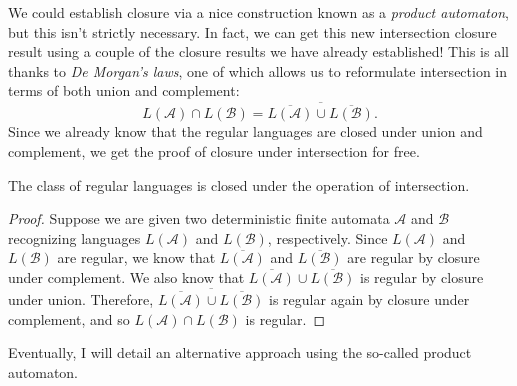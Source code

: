 We could establish closure via a nice construction known as a \emph{product automaton}, but this isn't strictly necessary. In fact, we can get this new intersection closure result using a couple of the closure results we have already established! This is all thanks to \emph{De Morgan's laws}, one of which allows us to reformulate intersection in terms of both union and complement:
\begin{equation*}
L(\mathcal{A}) \cap L(\mathcal{B}) = \overline{\overline{L(\mathcal{A})} \cup \overline{L(\mathcal{B})}}.
\end{equation*}
Since we already know that the regular languages are closed under union and complement, we get the proof of closure under intersection for free.

\begin{theorem}\label{thm:FAclosureintersection}
The class of regular languages is closed under the operation of intersection.

\begin{proof}
Suppose we are given two deterministic finite automata $\mathcal{A}$ and $\mathcal{B}$ recognizing languages $L(\mathcal{A})$ and $L(\mathcal{B})$, respectively. Since $L(\mathcal{A})$ and $L(\mathcal{B})$ are regular, we know that $\overline{L(\mathcal{A})}$ and $\overline{L(\mathcal{B})}$ are regular by closure under complement. We also know that $\overline{L(\mathcal{A})} \cup \overline{L(\mathcal{B})}$ is regular by closure under union. Therefore, $\overline{\overline{L(\mathcal{A})} \cup \overline{L(\mathcal{B})}}$ is regular again by closure under complement, and so $L(\mathcal{A}) \cap L(\mathcal{B})$ is regular.
\end{proof}
\end{theorem}

\begin{construction}
Eventually, I will detail an alternative approach using the so-called product automaton.
\end{construction}